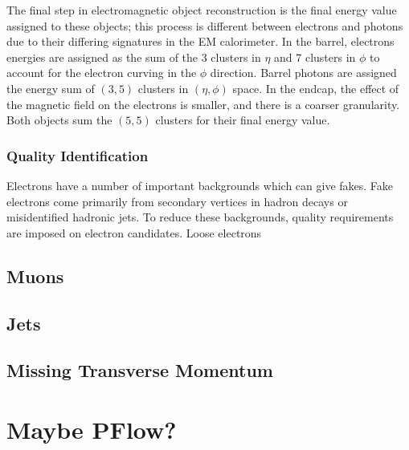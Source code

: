 The final step in electromagnetic object reconstruction is the final energy value assigned to these objects; this process is different between electrons and photons due to their differing signatures in the EM calorimeter.
In the barrel, electrons energies are assigned as the sum of the 3 clusters in $\eta$ and 7 clusters in $\phi$ to account for the electron curving in the $\phi$ direction.
Barrel photons are assigned the energy sum of $(3,5)$ clusters in $(\eta, \phi)$ space.
In the endcap, the effect of the magnetic field on the electrons is smaller, and there is a coarser granularity.
Both objects sum the $(5,5)$ clusters for their final energy value.

\subsubsection{Quality Identification}

Electrons have a number of important backgrounds which can give fakes.
Fake electrons come primarily from secondary vertices in hadron decays or misidentified hadronic jets.
To reduce these backgrounds, quality requirements are imposed on electron candidates.
Loose electrons

\subsection{Muons}

\subsection{Jets}

\subsection{Missing Transverse Momentum}

\section{Maybe PFlow?}